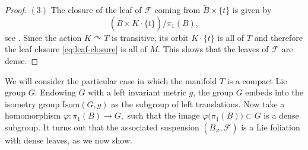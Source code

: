 \documentclass[11pt, letterpaper, oneside,reqno]{amsart}
\theoremstyle{plain}
\theoremstyle{underline}
\theoremstyle{definition}
\theoremstyle{remark}
\begin{document}
\begin{proof}
		
		$(3)$ The closure of the leaf of $\mathcal{F}$ coming from $\widetilde{B}\times\{t\}$ is given by 
		\begin{equation}\label{eq:leaf-closure}
			\left(\widetilde{B}\times K\cdot \{t\}\right)/\pi_1(B),
		\end{equation}
		see \cite[\S~3.7]{Molino}. Since the action $K\curvearrowright T$ is transitive, its orbit $K\cdot \{t\}$ is all of $T$ and therefore the leaf closure \eqref{eq:leaf-closure} is all of $M$. This shows that the leaves of $\mathcal{F}$ are dense.
	\end{proof}
	
	
	
	
	
	
	
	We will consider the particular case in which the manifold $T$ is a compact Lie group $G$. Endowing $G$ with a left invariant metric $g$, the group $G$ embeds into the isometry group $\text{Isom}(G,g)$ as the subgroup of left translations. Now take a homomorphism
	$
	\varphi:\pi_1(B)\rightarrow G,
	$
	such that the image $\varphi\big(\pi_1(B)\big)\subset G$ is a dense subgroup. It turns out that the associated suspension $(B_{\varphi},\mathcal{F})$ is a Lie foliation with dense leaves, as we now show.
	
\end{document}
